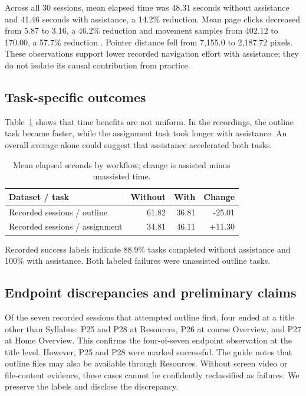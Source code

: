 \documentclass[11pt,a4paper]{article}
\begin{document}
Across all 30 sessions, mean elapsed time was 48.31 seconds without assistance and 41.46 seconds with assistance, a 14.2\% reduction. Mean page clicks decreased from 5.87 to 3.16, a 46.2\% reduction and movement samples from 402.12 to 170.00, a 57.7\% reduction . Pointer distance fell from 7,155.0 to
2,187.72 pixels. These observations support lower recorded navigation effort with assistance; they do not isolate its causal contribution from practice.

\subsection{Task-specific outcomes}
Table~\ref{tab:tasks} shows that time benefits are not uniform. In the recordings, the outline task became faster, while the assignment task took longer with assistance. An overall average alone could suggest that assistance accelerated both tasks.
\begin{table}[htbp]\centering\small
\caption{Mean elapsed seconds by workflow; change is assisted minus unassisted time.}\label{tab:tasks}
\begin{tabular}{lrrr}\toprule
Dataset / task & Without & With & Change\\\midrule
Recorded sessions / outline & 61.82 & 36.81 & -25.01 \\
Recorded sessions / assignment & 34.81 & 46.11 & +11.30 \\


\bottomrule\end{tabular}\end{table}

Recorded success labels indicate 88.9\% tasks completed without assistance  and 100\% with assistance. Both labeled failures were unassisted outline tasks.

\subsection{Endpoint discrepancies and preliminary claims}
Of the seven recorded sessions that attempted outline first, four ended at a title other than Syllabus: P25 and P28 at Resources, P26 at course Overview, and P27 at Home Overview. This confirms the four-of-seven endpoint observation at the title level. However, P25 and P28 were marked successful. The guide notes that outline files may also be available through Resources. Without screen video or file-content evidence, these cases cannot be confidently reclassified as failures. We preserve the labels and disclose the discrepancy.
\end{document}
